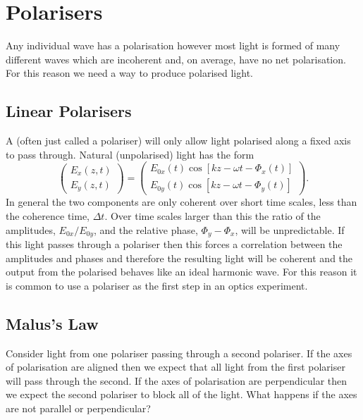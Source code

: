     \section{Polarisers}
    Any individual wave has a polarisation however most light is formed of many different waves which are incoherent and, on average, have no net polarisation.
    For this reason we need a way to produce polarised light.
    
    \subsection{Linear Polarisers}
    A  (often just called a polariser) will only allow light polarised along a fixed axis to pass through.
    Natural (unpolarised) light has the form
    \[
        \begin{pmatrix}
            E_x(z, t)\\
            E_y(z, t)
        \end{pmatrix}
        =
        \begin{pmatrix}
            E_{0x}(t)\cos[kz - \omega t - \Phi_x(t)]\\
            E_{0y}(t)\cos[kz - \omega t - \Phi_y(t)]
        \end{pmatrix}
        .
    \]
    In general the two components are only coherent over short time scales, less than the coherence time, \(\Delta t\).
    Over time scales larger than this the ratio of the amplitudes, \(E_{0x}/E_{0y}\), and the relative phase, \(\Phi_y - \Phi_x\), will be unpredictable.
    If this light passes through a polariser then this forces a correlation between the amplitudes and phases and therefore the resulting light will be coherent and the output from the polarised behaves like an ideal harmonic wave.
    For this reason it is common to use a polariser as the first step in an optics experiment.
    
    \subsection{Malus's Law}
    Consider light from one polariser passing through a second polariser.
    If the axes of polarisation are aligned then we expect that all light from the first polariser will pass through the second.
    If the axes of polarisation are perpendicular then we expect the second polariser to block all of the light.
    What happens if the axes are not parallel or perpendicular?
    
